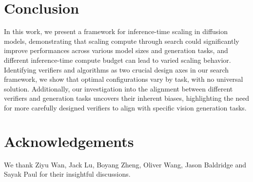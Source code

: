 \section{Conclusion}

In this work, we present a framework for inference-time scaling in diffusion models, demonstrating that scaling compute through search could significantly improve performances across various model sizes and generation tasks, and different inference-time compute budget can lead to varied scaling behavior. Identifying verifiers and algorithms as two crucial design axes in our search framework, we show that optimal configurations vary by task, with no universal solution. Additionally, our investigation into the alignment between different verifiers and generation tasks uncovers their inherent biases, highlighting the need for more carefully designed verifiers to align with specific vision generation tasks.

\vspace{-0.2cm}
\section*{Acknowledgements}
\vspace{-0.2cm}
We thank Ziyu Wan, Jack Lu, Boyang Zheng, Oliver Wang, Jason Baldridge and Sayak Paul for their insightful discussions.
